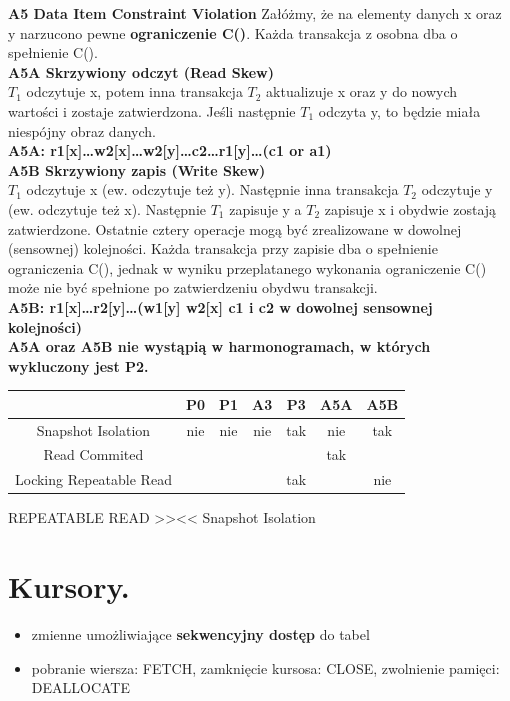 \documentclass[a4paper]{article}
\begin{document}
    \textbf{A5 Data Item Constraint Violation}
    Załóżmy, że na elementy danych x oraz y narzucono pewne \textbf{ograniczenie C()}. Każda transakcja z osobna dba
    o spełnienie C().\\

    \textbf{A5A Skrzywiony odczyt (Read Skew)}\\
    $T_1$ odczytuje x, potem inna transakcja $T_2$ aktualizuje x
    oraz y do nowych wartości i zostaje zatwierdzona. Jeśli następnie $T_1$ odczyta y, to będzie miała niespójny obraz
    danych.\\
    \textbf{A5A: r1[x]\ldots w2[x]\ldots w2[y]\ldots c2\ldots r1[y]\ldots (c1 or a1)}\\

    \textbf{A5B Skrzywiony zapis (Write Skew)}\\
    $T_1$ odczytuje x (ew. odczytuje też y). Następnie inna
    transakcja $T_2$ odczytuje y (ew. odczytuje też x). Następnie $T_1$ zapisuje y a $T_2$ zapisuje x i
    obydwie zostają zatwierdzone. Ostatnie cztery operacje mogą być zrealizowane w dowolnej (sensownej) kolejności.
    Każda transakcja przy zapisie dba o spełnienie ograniczenia C(), jednak w wyniku przeplatanego wykonania
    ograniczenie C() może nie być spełnione po zatwierdzeniu obydwu transakcji.\\
    \textbf{A5B: r1[x]\ldots r2[y]\ldots (w1[y] w2[x] c1 i c2 w dowolnej sensownej kolejności)}\\

    \textbf{A5A oraz A5B nie wystąpią w harmonogramach, w których wykluczony jest P2.}\\

    \begin{tabular}{|c|c|c|c|c|c|c|}
        \hline
        & P0  & P1  & A3  & P3  & A5A & A5B \\
        \hline
        Snapshot Isolation      & nie & nie & nie & tak & nie & tak \\
        \hline
        Read Commited           &     &     &     &     & tak &     \\
        \hline
        Locking Repeatable Read &     &     &     & tak &     & nie \\
        \hline
    \end{tabular}

    REPEATABLE READ >><< Snapshot Isolation


    \section{Kursory.}
    \begin{itemize}[noitemsep]
        \item zmienne umożliwiające \textbf{sekwencyjny dostęp} do tabel
        \item pobranie wiersza: FETCH, zamknięcie kursosa: CLOSE, zwolnienie pamięci: DEALLOCATE
    \end{itemize}
\end{document}
